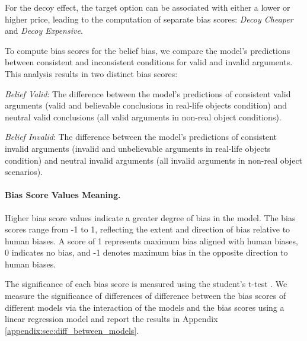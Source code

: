 For the decoy effect, the target option can be associated with either a lower or higher price, leading to the computation of separate bias scores: \textit{Decoy Cheaper} and \textit{Decoy Expensive}.

To compute bias scores for the belief bias, we compare the model's predictions between consistent and inconsistent conditions for valid and invalid arguments. 
This analysis results in two distinct bias scores:

\textit{Belief Valid}: The difference between the model's predictions of consistent valid arguments (valid and believable conclusions in real-life objects condition) and neutral valid conclusions (all valid arguments in non-real object conditions).

\textit{Belief Invalid}: The difference between the model's predictions of consistent invalid arguments (invalid and unbelievable arguments in real-life objects condition) and neutral invalid arguments (all invalid arguments in non-real object scenarios).

\paragraph{Bias Score Values Meaning.}
Higher bias score values indicate a greater degree of bias in the model.
The bias scores range from -1 to 1, reflecting the extent and direction of bias relative to human biases.
A score of 1 represents maximum bias aligned with human biases, 0 indicates no bias, and -1 denotes maximum bias in the opposite direction to human biases.

The significance of each bias score is measured using the student's t-test \cite{student1908probable}.
We measure the significance of differences of difference between the bias scores of different models via the interaction of the models and the bias scores using a linear regression model and report the results in Appendix \ref{appendix:sec:diff_between_models}.

